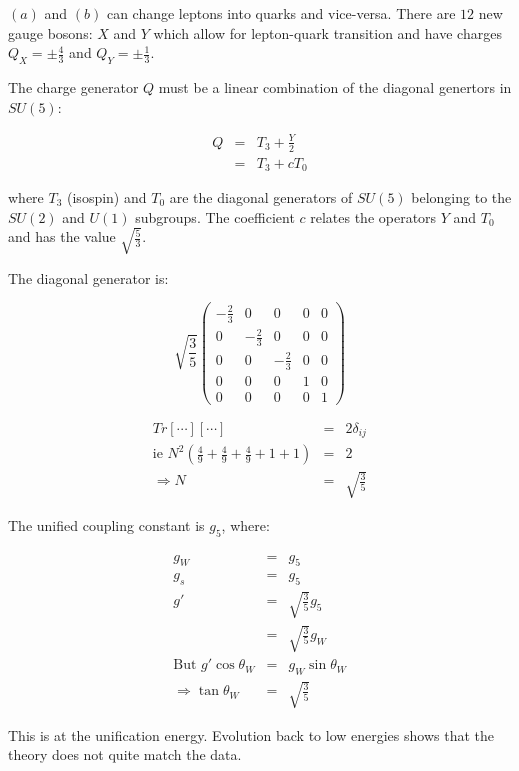 $(a)$ and $(b)$ can change leptons into quarks and vice-versa.  There are $12$ new gauge bosons: $X$ and $Y$ which allow for lepton-quark transition and have charges $Q_X = \pm\frac{4}{3}$ and $Q_Y = \pm \frac{1}{3}$.

The charge generator $Q$ must be a linear combination of the diagonal genertors in $SU(5)$:

\begin{eqnarray*}
  Q & = & T_3 + \frac{Y}{2} \\
    & = & T_3 + cT_0
\end{eqnarray*}

where $T_3$ (isospin) and $T_0$ are the diagonal generators of $SU(5)$ belonging to the $SU(2)$ and $U(1)$ subgroups.  The coefficient $c$ relates the operators $Y$ and $T_0$ and has the value $\sqrt{\frac{5}{3}}$.

The diagonal generator is:

\[
  \sqrt{\frac{3}{5}}
  \left(
  \begin{array}{ccccc}
    -\frac{2}{3} & 0 & 0 & 0 & 0 \\
    0 & -\frac{2}{3} & 0 & 0 & 0 \\
    0 & 0 & -\frac{2}{3} & 0 & 0 \\
    0 & 0 & 0 & 1 & 0 \\
    0 & 0 & 0 & 0 & 1
  \end{array}
  \right)
\]

\begin{eqnarray*}
  Tr[\cdots][\cdots] & = & 2\delta_{ij} \\
  \textrm{ie } N^2\left(\frac{4}{9} + \frac{4}{9} + \frac{4}{9} + 1 + 1\right) & = & 2 \\
  \Rightarrow N & = & \sqrt{\frac{3}{5}}
\end{eqnarray*}

The unified coupling constant is $g_5$, where:

\begin{eqnarray*}
  g_W & = & g_5 \\
  g_s & = & g_5 \\
  g'  & = & \sqrt{\frac{3}{5}} g_5 \\
      & = & \sqrt{\frac{3}{5}} g_W \\
  \textrm{But } g'\cos\theta_W & = & g_W\sin\theta_W \\
  \Rightarrow \tan\theta_W & = & \sqrt{\frac{3}{5}}
\end{eqnarray*}

This is at the unification energy.  Evolution back to low energies shows that the theory does not quite match the data.

